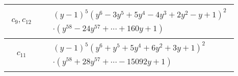 \documentclass[1p]{elsarticle_modified}
\theoremstyle{definition}
\begin{document}
\begin{tabular}{m{50pt}|m{274pt}}
\hline $$\begin{aligned}c_{9},c_{12}\end{aligned}$$&$\begin{aligned}
&(y-1)^5(y^6-3 y^5+5 y^4-4 y^3+2 y^2- y+1)^2\\
&\cdot(y^{58}-24 y^{57}+\cdots+160 y+1)
\end{aligned}$\\
\hline $$\begin{aligned}c_{11}\end{aligned}$$&$\begin{aligned}
&(y-1)^5(y^6+y^5+5 y^4+6 y^2+3 y+1)^2\\
&\cdot(y^{58}+28 y^{57}+\cdots-15092 y+1)
\end{aligned}$\\
\hline
\end{tabular}
\vskip 2pc
\end{document}
